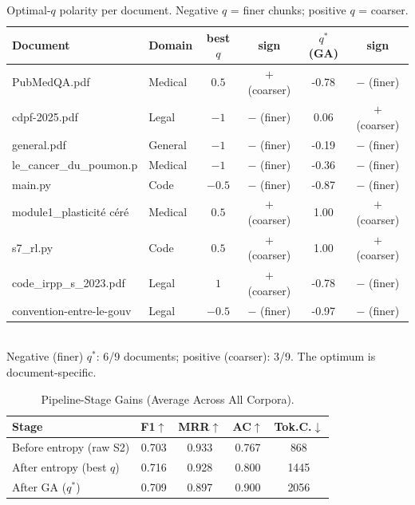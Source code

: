 \begin{table}[t]\centering
\caption{Optimal-$q$ polarity per document. Negative $q$ = finer chunks; positive $q$ = coarser.}
\label{tab:qsign}
\begin{tabular}{@{}llcccc@{}}\toprule
Document & Domain & best $q$ & sign & $q^{*}$(GA) & sign \\\midrule
PubMedQA.pdf & Medical & $0.5$ & $+$ (coarser) & -0.78 & $-$ (finer) \\
cdpf-2025.pdf & Legal & $-1$ & $-$ (finer) & 0.06 & $+$ (coarser) \\
general.pdf & General & $-1$ & $-$ (finer) & -0.19 & $-$ (finer) \\
le\_cancer\_du\_poumon.p & Medical & $-1$ & $-$ (finer) & -0.36 & $-$ (finer) \\
main.py & Code & $-0.5$ & $-$ (finer) & -0.87 & $-$ (finer) \\
module1\_plasticité céré & Medical & $0.5$ & $+$ (coarser) & 1.00 & $+$ (coarser) \\
s7\_rl.py & Code & $0.5$ & $+$ (coarser) & 1.00 & $+$ (coarser) \\
code\_irpp\_s\_2023.pdf & Legal & $1$ & $+$ (coarser) & -0.78 & $-$ (finer) \\
convention-entre-le-gouv & Legal & $-0.5$ & $-$ (finer) & -0.97 & $-$ (finer) \\
\bottomrule\end{tabular}
\\[2pt]\footnotesize Negative (finer) $q^{*}$: 6/9 documents; positive (coarser): 3/9. The optimum is document-specific.
\end{table}

\begin{table}[t]\centering
\caption{Pipeline-Stage Gains (Average Across All Corpora).}
\label{tab:stages}
\begin{tabular}{@{}lcccc@{}}\toprule
Stage & F1$\uparrow$ & MRR$\uparrow$ & AC$\uparrow$ & Tok.C.$\downarrow$ \\\midrule
Before entropy (raw S2) & 0.703 & 0.933 & 0.767 & 868 \\
After entropy (best $q$) & 0.716 & 0.928 & 0.800 & 1445 \\
\rowcolor{green!18}After GA ($q^{*}$) & 0.709 & 0.897 & 0.900 & 2056 \\
\bottomrule\end{tabular}\end{table}